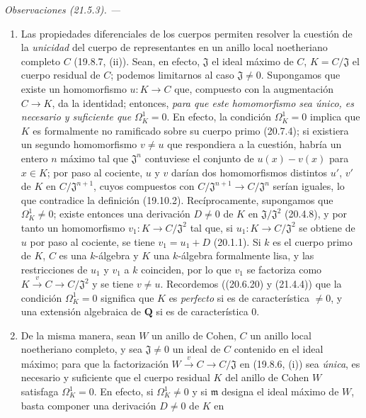 \documentclass[10pt,oneside]{book}
\makeatletter
\newcommand{\setmanualcurrentlabel}[1]{\def\@currentlabel{#1}}
\newenvironment{remarks}[1][]{%
  \setmanualcurrentlabel{#1}\par\medskip\noindent\itshape Observaciones (#1). ---\ }{\par}
\providecommand{\setmin}{-}%
\makeatother
\begin{document}
\begin{remarks}[21.5.3]
\label{0.21.5.3-es}
\begin{enumerate}
  \item[(i)] Las propiedades diferenciales de los cuerpos permiten resolver la
  cuestión de la \emph{unicidad} del cuerpo de representantes en un anillo local
  noetheriano completo $C$ (19.8.7, (ii)). Sean, en efecto, $\mathfrak J$ el ideal máximo
  de $C$, $K=C/\mathfrak J$ el cuerpo residual de $C$; podemos limitarnos al
  caso $\mathfrak J\ne0$. Supongamos que existe un homomorfismo $u:K\to C$
  que, compuesto con la augmentación $C\to K$, da la identidad; entonces, \emph{para
  que este homomorfismo sea único, es necesario y suficiente que}
  $\Omega^1_K=0$. En efecto, la condición $\Omega^1_K=0$ implica que $K$ es
  formalmente no ramificado sobre su cuerpo primo (20.7.4); si existiera un
  segundo homomorfismo $v\ne u$ que respondiera a la cuestión, habría un
  entero $n$ máximo tal que $\mathfrak J^n$ contuviese el conjunto de
  $u(x)\setmin v(x)$ para $x\in K$; por paso al cociente, $u$ y $v$ darían dos
  homomorfismos distintos $u'$, $v'$ de $K$ en
  $C/\mathfrak J^{n+1}$, cuyos compuestos con
  $C/\mathfrak J^{n+1}\to C/\mathfrak J^n$ serían iguales, lo que contradice
  la definición (19.10.2). Recíprocamente, supongamos que $\Omega^1_K\ne0$;
  existe entonces una derivación $D\ne0$ de $K$ en
  $\mathfrak J/\mathfrak J^2$ (20.4.8), y por tanto un homomorfismo
  $v_1:K\to C/\mathfrak J^2$ tal que, si $u_1:K\to C/\mathfrak J^2$ se
  obtiene de $u$ por paso al cociente, se tiene $v_1=u_1+D$
  (20.1.1). Si $k$ es el cuerpo primo de $K$, $C$ es una $k$-álgebra y
  $K$ una $k$-álgebra formalmente lisa, y las restricciones de
  $u_1$ y $v_1$ a $k$ coinciden, por lo que $v_1$ se factoriza como
  $K\xrightarrow{v}C\to C/\mathfrak J^2$ y se tiene $v\ne u$.
  Recordemos ((20.6.20) y (21.4.4)) que la condición $\Omega^1_K=0$ significa
  que $K$ es \emph{perfecto} si es de característica $\ne0$, y una extensión
  algebraica de $\mathbf Q$ si es de característica $0$.
  \item[(ii)] De la misma manera, sean $W$ un anillo de Cohen, $C$ un anillo
  local noetheriano completo, y sea $\mathfrak J\ne0$ un ideal de $C$ contenido en
  el ideal máximo; para que la factorización $W\xrightarrow{v}C\to C/\mathfrak J$
  en (19.8.6, (i)) sea \emph{única}, es necesario y suficiente que el cuerpo residual
  $K$ del anillo de Cohen $W$ satisfaga $\Omega^1_K=0$. En efecto, si
  $\Omega^1_K\ne0$ y si $\mathfrak m$ designa el ideal máximo de $W$, basta
  componer una derivación $D\ne0$ de $K$ en

\end{enumerate}
\end{remarks}
\end{document}
